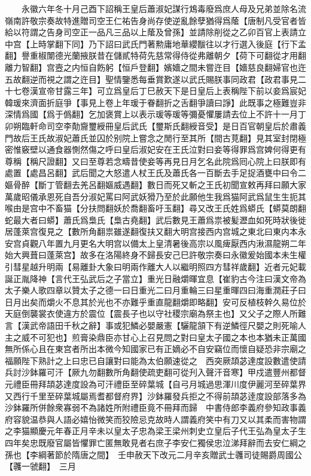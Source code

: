 　　永徽六年冬十月己酉下詔稱王皇后蕭淑妃謀行鴆毒廢爲庶人母及兄弟並除名流嶺南許敬宗奏故特進贈司空王仁祐告身尚存使逆亂餘孽猶得爲䕃【唐制凡受官者皆給以符謂之告身司空正一品凡三品以上䕃及曾孫】並請除削從之乙卯百官上表請立中宫【上時掌翻下同】乃下詔曰武氏門著勲庸地華纓黻往以才行選入後庭【行下孟翻】譽重椒闈德光蘭掖朕昔在儲貳特荷先慈常得侍從弗離朝夕【荷下可翻從才用翻離力智翻】宫壼之内恒自飭躬【恒戶登翻】嬪嬙之間未嘗迕目【嬙慈良翻婦官也迕五故翻逆而視之謂之迕目】聖情鑒悉每垂賞歎遂以武氏賜朕事同政君【政君事見二十七卷漢宣帝甘露三年】可立爲皇后丁巳赦天下是日皇后上表稱陛下前以妾爲宸妃韓瑗來濟面折庭爭【事見上卷上年瑗于眷翻折之舌翻爭讀曰諍】此既事之極難豈非深情爲國【爲于僞翻】乞加褒賞上以表示瑗等瑗等彌憂懼屢請去位上不許十一月丁卯朔臨軒命司空李勣齎璽綬冊皇后武氏【璽斯氏翻綬音受】是日百官朝皇后於肅義門故后王氏故淑妃蕭氏並囚於别院上嘗念之閒行至其所【間古莧翻】見其室封閉極密惟竅壁以通食器惻然傷之呼曰皇后淑妃安在王氏泣對曰妾等得罪爲宫婢何得更有尊稱【稱尺證翻】又曰至尊若念疇昔使妾等再見日月乞名此院爲囘心院上曰朕即有處置【處昌呂翻】武后聞之大怒遣人杖王氏及蕭氏各一百斷去手足捉酒甕中曰令二嫗骨醉【斷丁管翻去羌呂翻嫗威遇翻】數日而死又斬之王氏初聞宣敕再拜曰願大家萬歲昭儀承恩死自吾分淑妃罵曰阿武妖猾乃至於此願他生我爲猫阿武爲鼠生生扼其喉由是宫中不畜猫【分扶問翻妖於喬翻畜吁玉翻】尋又改王氏姓爲蟒氏【蟒莫朗翻蛇最大者曰蟒】蕭氏爲梟氏【梟古堯翻】武后數見王蕭爲祟被髪瀝血如死時狀後徙居蓬萊宫復見之【數所角翻祟雖遂翻復扶又翻大明宫接西内宫城之東北曰東内本永安宫貞觀八年置九月更名大明宫以備太上皇清暑後高宗以風痺厭西内湫濕龍朔二年始大興葺曰蓬萊宫】故多在洛陽終身不歸長安己巳許敬宗奏曰永徽爰始國本未生權引彗星越升明兩【易離卦大象曰明兩作離大人以繼明照四方彗祥歲翻】近者元妃載誕正胤降神【言代王弘武后之子當立】重光日融爝暉宜息【崔豹古今注曰漢文帝為太子樂人歌四章以贊太子之德一曰日重光二曰月重輪三曰星重暉四曰海重潤莊子曰日月出矣而爝火不息其於光也不亦難乎重直龍翻爝即略翻】安可反植枝幹久易位於天庭倒襲裳衣使違方於震位【震長子也以守社稷宗廟為祭主也】又父子之際人所難言【漢武帝語田千秋之辭】事或犯鱗必嬰嚴憲【驪龍頷下有逆鱗徑尺嬰之則死喻人主之威不可犯也】煎膏染鼎臣亦甘心上召見問之對曰皇太子國之本也本猶未正萬國無所係心且在東宫者所出本微今知國家已有正嫡必不自安竊位而懷自疑恐非宗廟之福願陛下熟計之上曰忠已自讓對曰能為太伯願速從之　西突厥頡苾達度設數遣使請兵討沙鉢羅可汗【厥九勿翻數所角翻使疏吏翻可從刋入聲汗音寒】甲戍遣豐州都督元禮臣冊拜頡苾達度設為可汗禮臣至碎葉城【自弓月城過思渾川度伊麗河至碎葉界又西行千里至碎葉城屬焉耆都督府界】沙鉢羅發兵拒之不得前頡苾逹度設部落多為沙鉢羅所併餘衆寡弱不為諸姓所附禮臣竟不冊拜而歸　中書侍郎李義府參知政事義府容貌温恭與人語必嬉怡微笑而狡險忌克故時人謂義府笑中有刀又以其柔而害物謂之李猫顯慶元年春正月辛未以皇太子忠為梁王梁州刺史立皇后子代王弘為皇太子生四年矣忠既廢官屬皆懼罪亡匿無敢見者右庶子李安仁獨侯忠泣涕拜辭而去安仁綱之孫也【李綱著節於隋唐之間】　壬申赦天下改元二月辛亥贈武士彠司徒賜爵周國公【彠一虢翻】　三月

